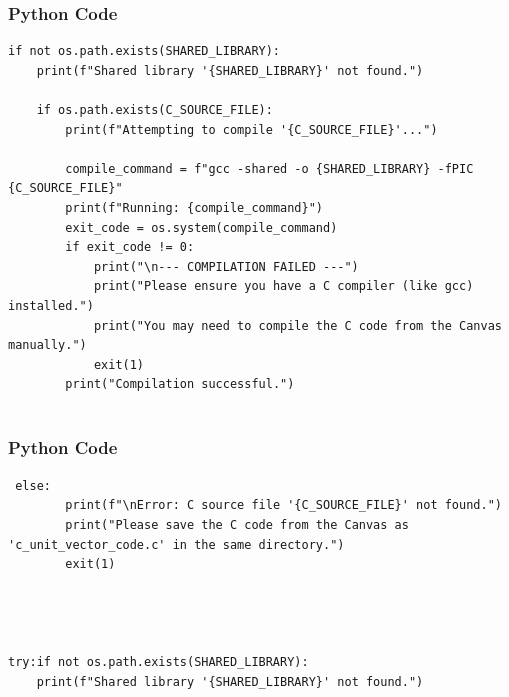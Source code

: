\documentclass{beamer}
\begin{document}
\begin{frame}[fragile]
    \frametitle{Python Code}
    \begin{lstlisting}
if not os.path.exists(SHARED_LIBRARY):
    print(f"Shared library '{SHARED_LIBRARY}' not found.")
    
    if os.path.exists(C_SOURCE_FILE):
        print(f"Attempting to compile '{C_SOURCE_FILE}'...")
        
        compile_command = f"gcc -shared -o {SHARED_LIBRARY} -fPIC {C_SOURCE_FILE}"
        print(f"Running: {compile_command}")
        exit_code = os.system(compile_command)
        if exit_code != 0:
            print("\n--- COMPILATION FAILED ---")
            print("Please ensure you have a C compiler (like gcc) installed.")
            print("You may need to compile the C code from the Canvas manually.")
            exit(1)
        print("Compilation successful.")
   
    \end{lstlisting}
\end{frame}

\begin{frame}[fragile]
    \frametitle{Python Code}
    \begin{lstlisting}
 else:
        print(f"\nError: C source file '{C_SOURCE_FILE}' not found.")
        print("Please save the C code from the Canvas as 'c_unit_vector_code.c' in the same directory.")
        exit(1)




try:if not os.path.exists(SHARED_LIBRARY):
    print(f"Shared library '{SHARED_LIBRARY}' not found.")
  
    \end{lstlisting}
\end{frame}
\end{document}
